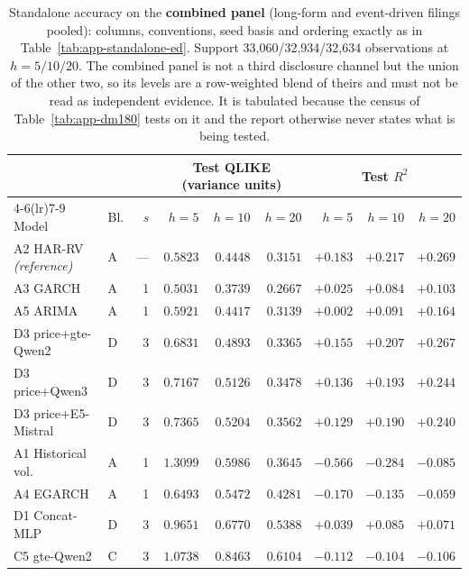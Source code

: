 \begin{table}[p]
\centering
\caption[Standalone accuracy, combined panel]{Standalone accuracy on the
\textbf{combined panel} (long-form and event-driven filings pooled):
columns, conventions, seed basis and ordering exactly as in
Table~\ref{tab:app-standalone-ed}. Support 33{,}060/32{,}934/32{,}634
observations at $h = 5/10/20$. The combined panel is not a third
disclosure channel but the union of the other two, so its levels are a
row-weighted blend of theirs and must not be read as independent evidence.
It is tabulated because the census of Table~\ref{tab:app-dm180} tests on it
and the report otherwise never states what is being tested.}
\label{tab:app-standalone-comb}
\singlespacing\small
\setlength{\tabcolsep}{4pt}
\begin{tabular}{@{}llrrrrrrr@{}}
\toprule
& & & \multicolumn{3}{c}{Test QLIKE (variance units)} & \multicolumn{3}{c}{Test $R^2$} \\
\cmidrule(lr){4-6}\cmidrule(lr){7-9}
Model & Bl. & $s$ & $h{=}5$ & $h{=}10$ & $h{=}20$ & $h{=}5$ & $h{=}10$ & $h{=}20$ \\
\midrule
A2 HAR-RV \emph{(reference)} & A & --- & $0.5823$ & $0.4448$ & $0.3151$ & $+0.183$ & $+0.217$ & $+0.269$ \\
\addlinespace
A3 GARCH & A & 1 & $0.5031$ & $0.3739$ & $0.2667$ & $+0.025$ & $+0.084$ & $+0.103$ \\
A5 ARIMA & A & 1 & $0.5921$ & $0.4417$ & $0.3139$ & $+0.002$ & $+0.091$ & $+0.164$ \\
D3 price+gte-Qwen2 & D & 3 & $0.6831$ & $0.4893$ & $0.3365$ & $+0.155$ & $+0.207$ & $+0.267$ \\
D3 price+Qwen3 & D & 3 & $0.7167$ & $0.5126$ & $0.3478$ & $+0.136$ & $+0.193$ & $+0.244$ \\
D3 price+E5-Mistral & D & 3 & $0.7365$ & $0.5204$ & $0.3562$ & $+0.129$ & $+0.190$ & $+0.240$ \\
A1 Historical vol. & A & 1 & $1.3099$ & $0.5986$ & $0.3645$ & $-0.566$ & $-0.284$ & $-0.085$ \\
A4 EGARCH & A & 1 & $0.6493$ & $0.5472$ & $0.4281$ & $-0.170$ & $-0.135$ & $-0.059$ \\
D1 Concat-MLP & D & 3 & $0.9651$ & $0.6770$ & $0.5388$ & $+0.039$ & $+0.085$ & $+0.071$ \\
C5 gte-Qwen2 & C & 3 & $1.0738$ & $0.8463$ & $0.6104$ & $-0.112$ & $-0.104$ & $-0.106$ \\

\end{tabular}
\end{table}

